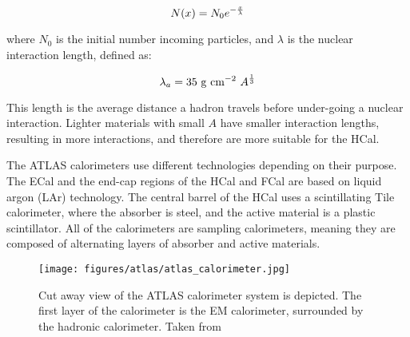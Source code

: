 \begin{equation}
    \centering
    N(x) = N_{0} e^{-\frac{x}{\lambda}}
    \label{eq:hadronic_num_remaining}
\end{equation}

\noindent{}where $N_{0}$ is the initial number incoming particles, and $\lambda$ is the nuclear interaction length, defined as:

\begin{equation}
    \centering
    \lambda_{a} = 35 \ \mathrm{g \ cm^{-2}} \ A^{\frac{1}{3}}
    \label{eq:absorption_length}
\end{equation}

\noindent{}This length is the average distance a hadron travels before under-going a nuclear interaction. Lighter materials with small $A$ have smaller interaction lengths, resulting in more interactions, and therefore are more suitable for the HCal\@.

The ATLAS calorimeters use different technologies depending on their purpose. The ECal and the end-cap regions of the HCal and FCal are based on liquid argon (LAr) technology. The central barrel of the HCal uses a scintillating Tile calorimeter, where the absorber is steel, and the active material is a plastic scintillator. All of the calorimeters are sampling calorimeters, meaning they are composed of alternating layers of absorber and active materials.

\begin{figure}
    \centering
    \texttt{[image: figures/atlas/atlas\_calorimeter.jpg]}
    \caption{Cut away view of the ATLAS calorimeter system is depicted. The first layer of the calorimeter is the EM calorimeter, surrounded by the hadronic calorimeter. Taken from~\cite{atlas_tile_calorimeter}}\label{fig:atlas_calorimeter}
\end{figure}
